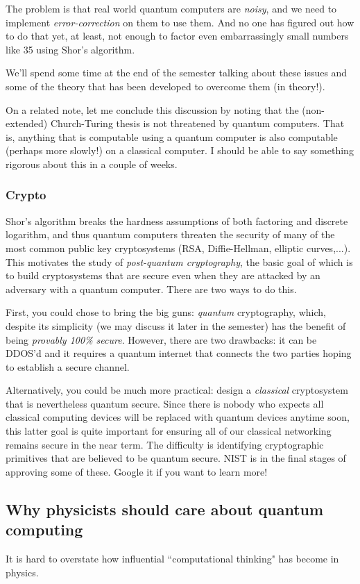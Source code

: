 \documentclass{article}
\begin{document}
The problem is that real world quantum computers are \emph{noisy}, and we need to implement \emph{error-correction} on them to use them.  And no one has figured out how to do that yet, at least, not enough to factor even embarrassingly small numbers like 35 using Shor's algorithm.

We'll spend some time at the end of the semester talking about these issues and some of the theory that has been developed to overcome them (in theory!).

On a related note, let me conclude this discussion by noting that the (non-extended) Church-Turing thesis is not threatened by quantum computers.  That is, anything that is computable using a quantum computer is also computable (perhaps more slowly!) on a classical computer.  I should be able to say something rigorous about this in a couple of weeks.


\subsubsection{Crypto}
Shor's algorithm breaks the hardness assumptions of both factoring and discrete logarithm, and thus quantum computers threaten the security of many of the most common public key cryptosystems (RSA, Diffie-Hellman, elliptic curves,...).  This motivates the study of \emph{post-quantum cryptography}, the basic goal of which is to build cryptosystems that are secure even when they are attacked by an adversary with a quantum computer.  There are two ways to do this.

First, you could chose to bring the big guns: \emph{quantum} cryptography, which, despite its simplicity (we may discuss it later in the semester) has the benefit of being \emph{provably 100\% secure}.  However, there are two drawbacks: it can be DDOS'd and it requires a quantum internet that connects the two parties hoping to establish a secure channel.

Alternatively, you could be much more practical: design a \emph{classical} cryptosystem that is nevertheless quantum secure.  Since there is nobody who expects all classical computing devices will be replaced with quantum devices anytime soon, this latter goal is quite important for ensuring all of our classical networking remains secure in the near term.  The difficulty is identifying cryptographic primitives that are believed to be quantum secure.  NIST is in the final stages of approving some of these.  Google it if you want to learn more!

\subsection{Why physicists should care about quantum computing}
It is hard to overstate how influential ``computational thinking" has become in physics.
\end{document}
